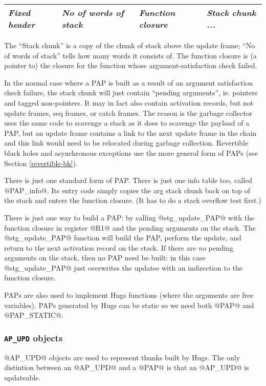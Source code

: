 \documentclass[11pt]{article}
\newcommand{\Subsubsection}[2]{\subsubsection{#1}\label{sec:#2}}
\begin{document}
\begin{center}
\begin{tabular}{|l|l|l|l|}\hline
\emph{Fixed header}  & \emph{No of words of stack} & \emph{Function closure} & \emph{Stack chunk ...} \\ \hline
\end{tabular}
\end{center}

The ``Stack chunk'' is a copy of the chunk of stack above the update
frame; ``No of words of stack'' tells how many words it consists of.
The function closure is (a pointer to) the closure for the function
whose argument-satisfaction check failed.

In the normal case where a PAP is built as a result of an argument
satisfaction check failure, the stack chunk will just contain
``pending arguments'', ie. pointers and tagged non-pointers.  It may
in fact also contain activation records, but not update frames, seq
frames, or catch frames.  The reason is the garbage collector uses the
same code to scavenge a stack as it does to scavenge the payload of a
PAP, but an update frame contains a link to the next update frame in
the chain and this link would need to be relocated during garbage
collection.  Revertible black holes and asynchronous exceptions use
the more general form of PAPs (see Section \ref{revertible-bh}).

There is just one standard form of PAP. There is just one info table
too, called @PAP_info@.  Its entry code simply copies the arg stack
chunk back on top of the stack and enters the function closure.  (It
has to do a stack overflow test first.)

There is just one way to build a PAP: by calling @stg_update_PAP@ with
the function closure in register @R1@ and the pending arguments on the
stack.  The @stg_update_PAP@ function will build the PAP, perform the
update, and return to the next activation record on the stack.  If
there are \emph{no} pending arguments on the stack, then no PAP need
be built: in this case @stg_update_PAP@ just overwrites the updatee
with an indirection to the function closure.

PAPs are also used to implement Hugs functions (where the arguments
are free variables).  PAPs generated by Hugs can be static so we need
both @PAP@ and @PAP_STATIC@.

\Subsubsection{\texttt{AP\_UPD} objects}{AP_UPD}

@AP_UPD@ objects are used to represent thunks built by Hugs.  The only
distintion between an @AP_UPD@ and a @PAP@ is that an @AP_UPD@ is
updateable.
\end{document}
